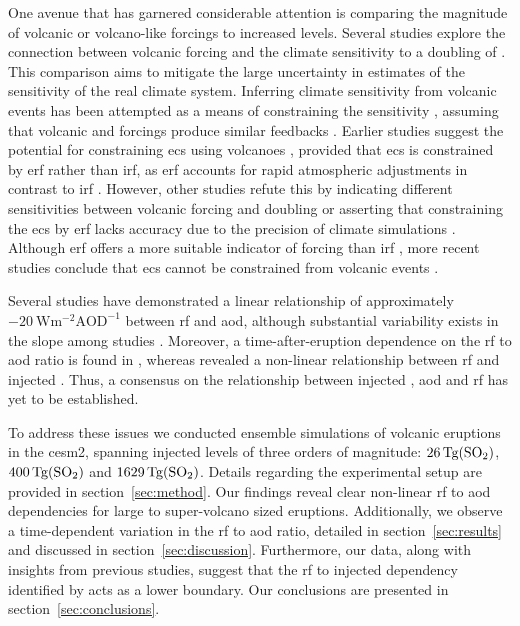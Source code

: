 \documentclass{ametsocV6.1}
\newcommand{\iso}[1][i]{{#1}njected \ce{SO2}}
\begin{document}
One avenue that has garnered considerable attention is comparing the magnitude of
volcanic or volcano-like forcings to increased  levels. Several studies explore
the connection between volcanic forcing and the climate sensitivity to a doubling of
\citep{boer2007,marvel2016,merlis2014,ollila2016,richardson2019,salvi2022,wigley2005}.
This comparison aims to mitigate the large uncertainty in estimates of the sensitivity
of the real climate system. Inferring climate sensitivity from volcanic events has been
attempted as a means of constraining the sensitivity \citep{boer2007}, assuming that
volcanic and  forcings produce similar feedbacks \citep{pauling2023}. Earlier
studies suggest the potential for constraining \gls{ecs} using volcanoes
\citep{bender2010}, provided that \gls{ecs} is constrained by \gls{erf} rather than
\gls{irf}, as \gls{erf} accounts for rapid atmospheric adjustments in contrast to
\gls{irf} \citep{richardson2019}. However, other studies refute this by indicating
different sensitivities between volcanic forcing and  doubling
\citep{douglass2006} or asserting that constraining the \gls{ecs} by \gls{erf} lacks
accuracy due to the precision of climate simulations \citep{boer2007,salvi2022}.
Although \gls{erf} offers a more suitable indicator of forcing than \gls{irf}
\citep{marvel2016,richardson2019}, more recent studies conclude that \gls{ecs} cannot be
constrained from volcanic events \citep{pauling2023}.

Several studies have demonstrated a linear relationship of approximately
\(-\SI{20}{\watt\metre^{-2}\mathrm{AOD}^{-1}}\) between \gls{rf} and \gls{aod}, although
substantial variability exists in the slope among studies
\citep{mills2017,hansen2005,gregory2016,marshall2020,pitari2016b}. Moreover, a
time-after-eruption dependence on the \gls{rf} to \gls{aod} ratio is found in
\citet{marshall2020}, whereas \citet{niemeier2015} revealed a non-linear relationship
between \gls{rf} and \iso{}. Thus, a consensus on the relationship between \iso{},
\gls{aod} and \gls{rf} has yet to be established.

To address these issues we conducted ensemble simulations of volcanic eruptions in the
\gls{cesm2}, spanning \iso{} levels of three orders of magnitude:
\(\SI{26}{\tera\gram(\ce{SO2})}\), \(\SI{400}{\tera\gram(\ce{SO2})}\) and
\(\SI{1629}{\tera\gram(\ce{SO2})}\). Details regarding the experimental setup are
provided in section~\ref{sec:method}. Our findings reveal clear non-linear \gls{rf} to
\gls{aod} dependencies for large to super-volcano sized eruptions. Additionally, we
observe a time-dependent variation in the \gls{rf} to \gls{aod} ratio, detailed in
section~\ref{sec:results} and discussed in section~\ref{sec:discussion}. Furthermore,
our data, along with insights from previous studies, suggest that the \gls{rf} to \iso{}
dependency identified by \citet{niemeier2015} acts as a lower boundary. Our conclusions
are presented in section~\ref{sec:conclusions}.
\end{document}
